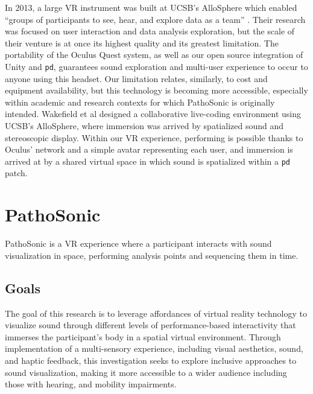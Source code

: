 \documentclass{nime-alternate}
\begin{document}
In 2013, a large VR instrument was built at UCSB's AlloSphere which enabled ``groups of participants to see, hear, and explore data as a team'' \cite{KUCHERAMORIN201410}. Their research was focused on user interaction and data analysis exploration, but the scale of their venture is at once its highest quality and its greatest limitation. The portability of the Oculus Quest system, as well as our open source integration of Unity and \texttt{pd}, guarantees sound exploration and multi-user experience to occur to anyone using this headset. Our limitation relates, similarly, to cost and equipment availability, but this technology is becoming more accessible, especially within academic and research contexts for which PathoSonic is originally intended. Wakefield et al \cite{gwakefield2014} designed a collaborative live-coding environment using UCSB's AlloSphere, where immersion was arrived by spatialized sound and stereoscopic display. Within our VR experience, performing is possible thanks to Oculus' network and a simple avatar representing each user, and immersion is arrived at by a shared virtual space in which sound is spatialized within a \texttt{pd} patch. 

\section{PathoSonic}

PathoSonic is a VR experience where a participant interacts with sound visualization in space, performing analysis points and sequencing them in time.

\subsection{Goals}
The goal of this research is to leverage affordances of virtual reality technology to visualize sound through different levels of performance-based interactivity that immerses the participant's body in a spatial virtual environment. Through implementation of a multi-sensory experience, including visual aesthetics, sound, and haptic feedback, this investigation seeks to explore inclusive approaches to sound visualization, making it more accessible to a wider audience including those with hearing, and mobility impairments.

\end{document}
